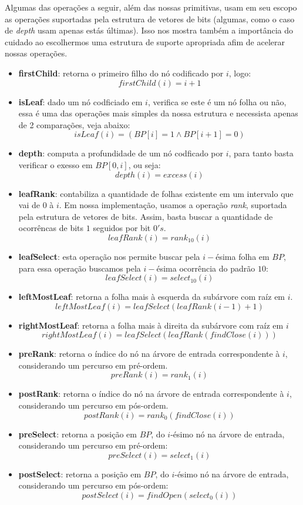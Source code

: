    Algumas das operações a seguir, além das nossas primitivas, usam em seu escopo as operações suportadas pela estrutura de vetores de bits (algumas, como o caso de \textit{depth} usam apenas estás últimas). Isso nos mostra também a importância do cuidado ao escolhermos uma estrutura de suporte apropriada afim de acelerar nossas operações.
        \begin{itemize}
            \item \textbf{firstChild}: retorna o primeiro filho do nó codificado por $i$, logo:
            $$firstChild(i) = i +1$$
            \item \textbf{isLeaf}: dado um nó codficiado em $i$, verifica se este é um nó folha ou não, essa é uma das operações mais simples da nossa estrutura e necessista apenas de 2 comparações, veja abaixo:
            $$isLeaf(i) = (BP[i] = 1 \land BP[i+1]=0)$$
            \item \textbf{depth}: computa a profundidade de um nó codficado por $i$, para tanto basta verificar o exesso em $BP[0,i]$, ou seja:
            $$depth(i) = excess(i)$$
            \item \textbf{leafRank}: contabiliza a quantidade de folhas existente em um intervalo que vai de $0$ à $i$. Em nossa implementação, usamos a operação \textit{rank},
            suportada pela estrutura de vetores de bits. Assim, basta buscar a quantidade de ocorrêncas de bits $1$ seguidos por bit $0's$.
            $$leafRank(i) = rank_{10}(i)$$
            \item \textbf{leafSelect}: esta operação nos permite buscar pela $i-$ésima folha em $BP$, para essa operação buscamos pela $i-$ésima ocorrência do padrão $10$:
            $$leafSelect(i) = select_{10}(i)$$
            \item \textbf{leftMostLeaf}: retorna a folha mais à esquerda da subárvore com raíz em $i$.
            $$leftMostLeaf(i) = leafSelect(leafRank(i-1)+1)$$
            \item  \textbf{rightMostLeaf}: retorna a folha mais à direita da subárvore com raíz em $i$
            $$rightMostLeaf(i) = leafSelect(leafRank(findClose(i)))$$
            \item \textbf{preRank}: retorna o índice do nó na árvore de entrada correspondente à $i$,  considerando um percurso em pré-ordem.
            $$preRank(i) = rank_1(i)$$
            \item \textbf{postRank}: retorna o índice do nó na árvore de entrada correspondente à $i$,  considerando um percurso em pós-ordem.
            $$postRank(i) = rank_0(findClose(i))$$
            \item \textbf{preSelect}: retorna a posição em $BP$, do $i$-ésimo nó na árvore de entrada, considerando um percurso em pré-ordem:
            $$preSelect(i) = select_1(i)$$
            \item \textbf{postSelect}: retorna a posição em $BP$, do $i$-ésimo nó na árvore de entrada, considerando um percurso em pós-ordem:
            $$postSelect(i) = findOpen(select_0(i))$$
        \end{itemize} 

